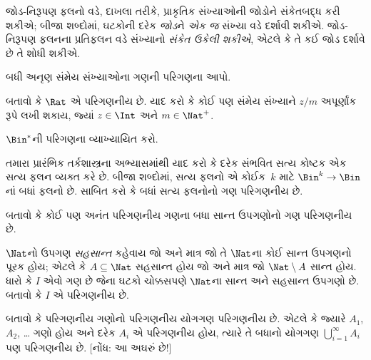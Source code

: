 \begin{explain}
જોડ-નિરૂપણ ફલનો વડે, દાખલા તરીકે, પ્રાકૃતિક
સંખ્યાઓની જોડોને સંકેતબદ્ધ કરી શકીએ; બીજા શબ્દોમાં,
ઘટકોની દરેક \emph{જોડ}ને \emph{એક જ} સંખ્યા વડે
દર્શાવી શકીએ. જોડ-નિરૂપણ ફલનના પ્રતિફલન વડે
સંખ્યાનો \emph{સંકેત ઉકેલી શકીએ}, એટલે કે તે
કઈ જોડ દર્શાવે છે તે શોધી શકીએ.
\end{explain}

\begin{prob}
બધી અનૃણ સંમેય સંખ્યાઓના ગણની પરિગણના આપો.
\end{prob}

\begin{prob}
બતાવો કે $\Rat$ એ પરિગણનીય છે.
યાદ કરો કે કોઈ પણ સંમેય સંખ્યાને $z/m$ અપૂર્ણાંક
રૂપે લખી શકાય, જ્યાં $z \in \Int$ અને $m \in \Nat^+$.
\end{prob}

\begin{prob}
$\Bin^*$ની પરિગણના વ્યાખ્યાયિત કરો.
\end{prob}

\begin{prob}
તમારા પ્રારંભિક તર્કશાસ્ત્રના અભ્યાસમાંથી યાદ કરો
કે દરેક સંભવિત સત્ય કોષ્ટક એક સત્ય ફલન વ્યક્ત
કરે છે. બીજા શબ્દોમાં, સત્ય ફલનો એ કોઈક~$k$
માટે $\Bin^k \to \Bin$નાં બધાં ફલનો છે.
સાબિત કરો કે બધાં સત્ય ફલનોનો ગણ પરિગણનીય છે.
\end{prob}

\begin{prob}
બતાવો કે કોઈ પણ અનંત પરિગણનીય ગણના
બધા સાન્ત ઉપગણોનો ગણ પરિગણનીય છે.
\end{prob}

\begin{prob}
$\Nat$નો ઉપગણ \emph{સહસાન્ત} કહેવાય જો અને માત્ર
જો તે $\Nat$ના કોઈ સાન્ત ઉપગણનો પૂરક હોય; એટલે કે
$A \subseteq \Nat$ સહસાન્ત હોય જો અને માત્ર જો
$\Nat\setminus A$ સાન્ત હોય. ધારો કે $I$ એવો ગણ
છે જેના ઘટકો ચોક્કસપણે $\Nat$ના સાન્ત
અને સહસાન્ત ઉપગણો છે. બતાવો કે $I$ એ પરિગણનીય છે.
\end{prob}

\begin{prob}
બતાવો કે પરિગણનીય ગણોનો પરિગણનીય
યોગગણ પરિગણનીય છે. એટલે કે જ્યારે
$A_1$, $A_2$, \dots{} ગણો હોય અને દરેક $A_i$
એ પરિગણનીય હોય, ત્યારે તે બધાનો યોગગણ
$\bigcup_{i=1}^\infty
A_i$ પણ પરિગણનીય છે. [નોંધ: આ અઘરું છે!]
\end{prob}

